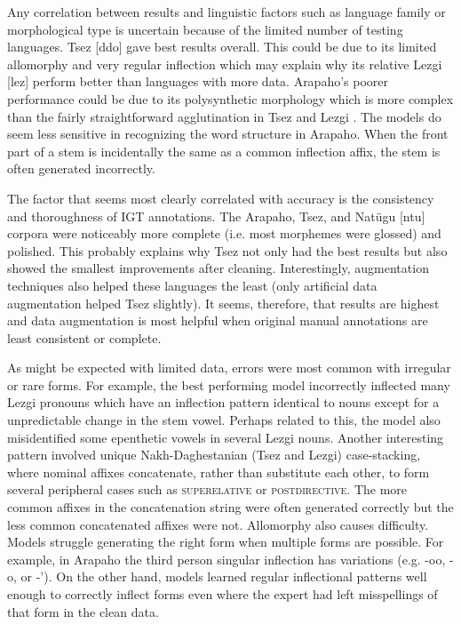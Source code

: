 Any correlation between results and linguistic factors such as language family or morphological type is uncertain because of the limited number of testing languages. Tsez [ddo] gave best results overall. This could be due to its limited allomorphy and very regular inflection which may explain why its relative Lezgi [lez] perform better than languages with more data. Arapaho's poorer performance could be due to its polysynthetic morphology \citep{cowell_arapaho_2008} which is more complex than the fairly straightforward agglutination in Tsez \citep{job_tsez_1994} and Lezgi \citep{haspelmath_grammar_1993}. The models do seem less sensitive in recognizing the word structure in Arapaho. When the front part of a stem is incidentally the same as a common inflection affix, the stem is often generated incorrectly.


The factor that seems most clearly correlated with accuracy is the consistency and thoroughness of IGT annotations. The Arapaho, Tsez, and  Nat\"ugu [ntu] corpora were noticeably more complete (i.e. most morphemes were glossed) and polished. This probably explains why Tsez not only had the best results but also showed the smallest improvements after cleaning. Interestingly, augmentation techniques also helped these languages the least (only artificial data augmentation helped Tsez slightly). It seems, therefore, that results are highest and data augmentation is most helpful when original manual annotations are least consistent or complete. 

As might be expected with limited data, errors were most common with irregular or rare forms. For example, the best performing model incorrectly inflected many Lezgi pronouns which have an inflection pattern identical to nouns except for a unpredictable change in the stem vowel. Perhaps related to this, the model also misidentified some epenthetic vowels in several Lezgi nouns. Another interesting pattern involved unique Nakh-Daghestanian (Tsez and Lezgi) case-stacking, where nominal affixes concatenate, rather than substitute each other, to form several peripheral cases such as \textsc{superelative} or \textsc{postdirective}. The more common affixes in the concatenation string were often generated correctly but the less common concatenated affixes were not. Allomorphy also causes difficulty. Models struggle generating the right form when multiple forms are possible. For example, in Arapaho the third person singular inflection has variations (e.g. -oo, -o, or -'). On the other hand, models learned regular inflectional patterns well enough to correctly inflect forms even where the expert had left misspellings of that form in the clean data.

